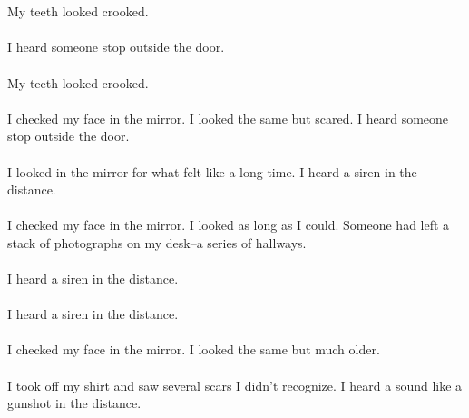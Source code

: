 \documentclass{article}
\begin{document}
    \section{}
    My teeth looked crooked. \\\\I heard someone stop outside the door. \\\\My teeth looked crooked. \\\\I checked my face in the mirror. I looked the same but scared. I heard someone stop outside the door. \\\\I looked in the mirror for what felt like a long time. I heard a siren in the distance. \\\\I checked my face in the mirror. I looked as long as I could. Someone had left a stack of photographs on my desk--a series of hallways. \\\\I heard a siren in the distance. \\\\I heard a siren in the distance. \\\\I checked my face in the mirror. I looked the same but much older. \\\\I took off my shirt and saw several scars I didn't recognize. I heard a sound like a gunshot in the distance. \\\\
    \newpage
    
\end{document}
